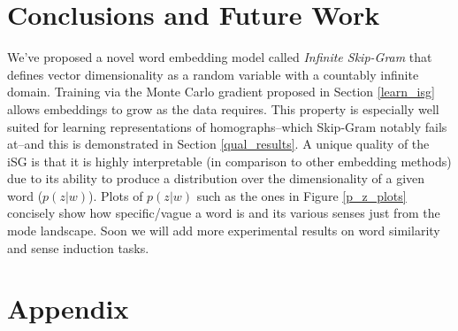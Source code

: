 \documentclass{article} %
\begin{document}
\section{Conclusions and Future Work}
We've proposed a novel word embedding model called \textit{Infinite Skip-Gram} that defines vector dimensionality as a random variable with a countably infinite domain.  Training via the Monte Carlo gradient proposed in Section \ref{learn_isg} allows embeddings to grow as the data requires.  This property is especially well suited for learning representations of homographs--which Skip-Gram notably fails at--and this is demonstrated in Section \ref{qual_results}.  A unique quality of the iSG is that it is highly interpretable (in comparison to other embedding methods) due to its ability to produce a distribution over the dimensionality of a given word ($p(z|w)$).  Plots of $p(z|w)$ such as the ones in Figure \ref{p_z_plots} concisely show how specific/vague a word is and its various senses just from the mode landscape.  Soon we will add more experimental results on word similarity and sense induction tasks.



\clearpage

\section*{Appendix}
\end{document}
